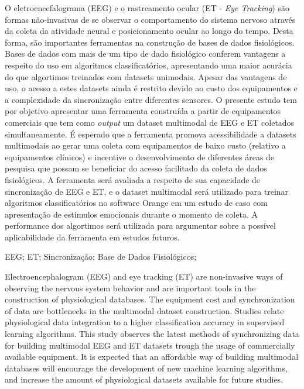 \documentclass[a4paper, 12pt]{ppgeb}
\begin{document}
O eletroencefalograma (EEG) e o rastreamento ocular (ET - \textit{Eye Tracking}) são 
formas não-invasivas de se observar o comportamento do sistema nervoso através da coleta da atividade
neural e posicionamento ocular ao longo do tempo. Desta forma, são importantes ferramentas na construção de bases de dados fisiológicos. 
Bases de dados com mais de um tipo de dado fisiológico conferem vantagens a respeito
do uso em algoritmos classificatórios, apresentando uma maior acurácia do que algortimos treinados
com datasets unimodais.
Apesar das vantagens de uso, o acesso a estes datasets ainda é restrito devido ao custo
dos equipamentos e a complexidade da sincronização entre diferentes sensores.
O presente estudo tem por objetivo apresentar uma ferramenta construída a partir de equipamentos
comerciais que tem como \textit{output} um dataset multimodal de EEG e ET coletados simultaneamente.
É esperado que a ferramenta promova acessibilidade a datasets multimodais ao gerar uma coleta com 
equipamentos de baixo custo (relativo a equipamentos clínicos) e incentive o desenvolvimento de diferentes áreas de pesquisa que possam se beneficiar do acesso facilitado da coleta de dados fisiológicos. A ferramenta será 
avaliada a respeito de sua capacidade de sincronização de EEG e ET, e o dataset multimodal será utilizado para treinar algoritmos 
classificatórios no software Orange em um estudo de caso com apresentação de estímulos emocionais durante o momento de coleta.
A performance dos algortimos será utilizada para argumentar sobre a possível aplicabilidade da ferramenta em estudos futuros.

\vspace{14pt}

 EEG; ET; Sincronização; Base de Dados Fisiológicos;
\acresetall %
\clearpage
\restoregeometry
\acresetall %
\vspace{24pt}

Electroencephalogram (EEG) and eye tracking (ET) are non-invasive ways of observing the nervous system behavior and are important tools in the construction of physiological databases. The equipment cost and synchronization of data are bottlenecks in the multimodal dataset construction. Studies relate physiological data integration to a higher classification accuracy in supervised learning algorithms. This study observes the latest methods of synchronizing data for building multimodal EEG and ET datasets trough the usage of commercially available equipment. It is expected that an affordable way of building multimodal databases will encourage the development of new machine learning algorithms, and increase the amount of physiological datasets available for future studies.
\end{document}

